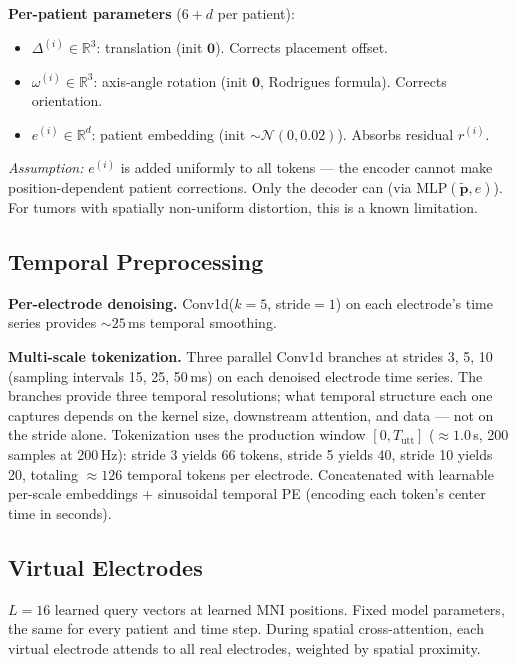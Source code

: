 \documentclass[11pt,letterpaper]{article}
\newcommand{\bfp}{\mathbf{p}}
\newcommand{\R}{\mathbb{R}}
\begin{document}
\textbf{Per-patient parameters} ($6 + d$ per patient):
\begin{itemize}[leftmargin=2em]
\item $\Delta^{(i)} \in \R^3$: translation (init $\mathbf{0}$). Corrects placement offset.
\item $\omega^{(i)} \in \R^3$: axis-angle rotation (init $\mathbf{0}$, Rodrigues formula). Corrects orientation.
\item $e^{(i)} \in \R^d$: patient embedding (init $\sim \mathcal{N}(0, 0.02)$). Absorbs residual $r^{(i)}$.
\end{itemize}

\textcolor{BrickRed}{\textit{Assumption:} $e^{(i)}$ is added uniformly to all tokens --- the encoder cannot make position-dependent patient corrections. Only the decoder can (via $\text{MLP}(\tilde{\bfp}, e)$). For tumors with spatially non-uniform distortion, this is a known limitation.}


\subsection{Temporal Preprocessing}

\textbf{Per-electrode denoising.} Conv1d($k{=}5$, stride${=}1$) on each electrode's time series provides ${\sim}25$\,ms temporal smoothing.

\textbf{Multi-scale tokenization.} Three parallel Conv1d branches at strides 3, 5, 10 (sampling intervals 15, 25, 50\,ms) on each denoised electrode time series. The branches provide three temporal resolutions; what temporal structure each one captures depends on the kernel size, downstream attention, and data --- not on the stride alone. Tokenization uses the production window $[0, T_{\text{utt}}]$ (${\approx}1.0$\,s, 200 samples at 200\,Hz): stride 3 yields 66 tokens, stride 5 yields 40, stride 10 yields 20, totaling ${\approx}126$ temporal tokens per electrode. Concatenated with learnable per-scale embeddings + sinusoidal temporal PE (encoding each token's center time in seconds).


\subsection{Virtual Electrodes}\label{sec:virtual-electrodes}

$L = 16$ learned query vectors at learned MNI positions. Fixed model parameters, the same for every patient and time step. During spatial cross-attention, each virtual electrode attends to all real electrodes, weighted by spatial proximity.
\end{document}
